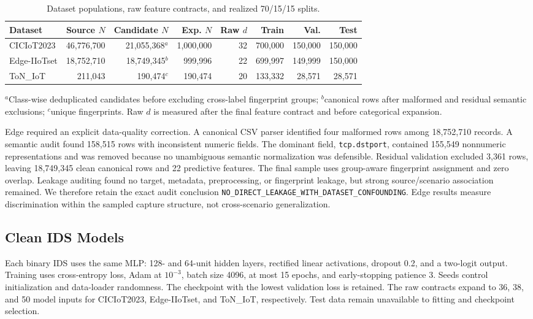 \documentclass[runningheads]{llncs}
\begin{document}
\begin{table}[t]
\caption{Dataset populations, raw feature contracts, and realized 70/15/15 splits.}
\label{tab:data}
\centering\small
\setlength{\tabcolsep}{2.8pt}
\begin{tabular}{lrrrrrrr}
\toprule
Dataset & Source $N$ & Candidate $N$ & Exp. $N$ & Raw $d$ & Train & Val. & Test\\
\midrule
CICIoT2023 & 46,776,700 & 21,055,368$^{a}$ & 1,000,000 & 32 & 700,000 & 150,000 & 150,000\\
Edge-IIoTset & 18,752,710 & 18,749,345$^{b}$ & 999,996 & 22 & 699,997 & 149,999 & 150,000\\
ToN\_IoT & 211,043 & 190,474$^{c}$ & 190,474 & 20 & 133,332 & 28,571 & 28,571\\
\bottomrule
\end{tabular}
\parbox{\textwidth}{\footnotesize $^{a}$Class-wise deduplicated candidates before excluding cross-label fingerprint groups; $^{b}$canonical rows after malformed and residual semantic exclusions; $^{c}$unique fingerprints. Raw $d$ is measured after the final feature contract and before categorical expansion.}
\end{table}

Edge required an explicit data-quality correction. A canonical CSV parser identified four malformed rows among 18,752,710 records. A semantic audit found 158,515 rows with inconsistent numeric fields. The dominant field, \texttt{tcp.dstport}, contained 155,549 nonnumeric representations and was removed because no unambiguous semantic normalization was defensible. Residual validation excluded 3,361 rows, leaving 18,749,345 clean canonical rows and 22 predictive features. The final sample uses group-aware fingerprint assignment and zero overlap. Leakage auditing found no target, metadata, preprocessing, or fingerprint leakage, but strong source/scenario association remained. We therefore retain the exact audit conclusion \texttt{NO\_DIRECT\_LEAKAGE\_WITH\_DATASET\_CONFOUNDING}. Edge results measure discrimination within the sampled capture structure, not cross-scenario generalization.

\subsection{Clean IDS Models}
Each binary IDS uses the same MLP: 128- and 64-unit hidden layers, rectified linear activations, dropout 0.2, and a two-logit output. Training uses cross-entropy loss, Adam at $10^{-3}$, batch size 4096, at most 15 epochs, and early-stopping patience 3. Seeds control initialization and data-loader randomness. The checkpoint with the lowest validation loss is retained. The raw contracts expand to 36, 38, and 50 model inputs for CICIoT2023, Edge-IIoTset, and ToN\_IoT, respectively. Test data remain unavailable to fitting and checkpoint selection.
\end{document}
